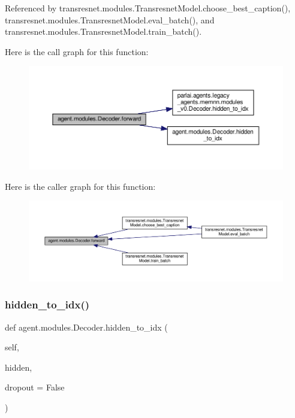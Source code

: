 Referenced by transresnet.\+modules.\+Transresnet\+Model.\+choose\+\_\+best\+\_\+caption(), transresnet.\+modules.\+Transresnet\+Model.\+eval\+\_\+batch(), and transresnet.\+modules.\+Transresnet\+Model.\+train\+\_\+batch().

Here is the call graph for this function\+:
\nopagebreak
\begin{figure}[H]
\begin{center}
\leavevmode
\includegraphics[width=350pt]{classagent_1_1modules_1_1Decoder_a4c609d3b51a4ef925c943c22a7a015e8_cgraph}
\end{center}
\end{figure}
Here is the caller graph for this function\+:
\nopagebreak
\begin{figure}[H]
\begin{center}
\leavevmode
\includegraphics[width=350pt]{classagent_1_1modules_1_1Decoder_a4c609d3b51a4ef925c943c22a7a015e8_icgraph}
\end{center}
\end{figure}
\mbox{\label{classagent_1_1modules_1_1Decoder_ad0179be7c6224482204f3ce575894573}} 
\subsubsection{\texorpdfstring{hidden\+\_\+to\+\_\+idx()}{hidden\_to\_idx()}}
{\footnotesize\ttfamily def agent.\+modules.\+Decoder.\+hidden\+\_\+to\+\_\+idx (\begin{DoxyParamCaption}\item[{}]{self,  }\item[{}]{hidden,  }\item[{}]{dropout = {\ttfamily False} }\end{DoxyParamCaption})}

